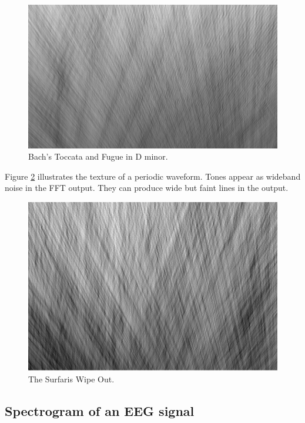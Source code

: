 \begin{figure}
  \includegraphics[width=\linewidth]{../source/bach220.jpg}
  \caption{Bach's Toccata and Fugue in D minor.}
  \label{fig:bach220}
\end{figure}

Figure \ref{fig:surfariswipeout} illustrates the texture of a periodic waveform.
Tones appear as wideband noise in the FFT output. 
They can produce wide but faint lines in the output.

\begin{figure}
  \includegraphics[width=\linewidth]{../source/surfariswipeout.jpg}
  \caption{The Surfaris Wipe Out.}
  \label{fig:surfariswipeout}
\end{figure}


\subsection{Spectrogram of an EEG signal}

